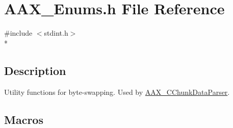 \hypertarget{a00206}{}\section{A\+A\+X\+\_\+\+Enums.\+h File Reference}
\label{a00206}
{\ttfamily \#include $<$stdint.\+h$>$}\\*


\subsection{Description}
Utility functions for byte-\/swapping. Used by \hyperlink{a00014}{A\+A\+X\+\_\+\+C\+Chunk\+Data\+Parser}. 

\subsection*{Macros}
